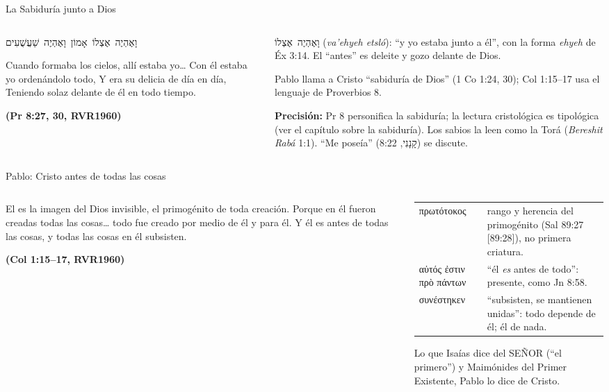 \documentclass[hyperref={bookmarks=false},aspectratio=169]{beamer}
\newcommand{\heb}[1]{\mbox{\foreignlanguage{hebrew}{#1}}}
\newcommand{\grc}[1]{\foreignlanguage{ancientgreek}{#1}}
\newcommand{\SENOR}{S{\fontsize{0.78em}{1em}\selectfont EÑOR}}
\newcommand{\fuente}[1]{\par\hfill{\upshape\bfseries\footnotesize\textcolor{azul}{#1}}}
\newcommand{\precision}[1]{{\footnotesize\color{gris}\textbf{Precisión:} #1}}
\begin{document}
\begin{frame}{La Sabiduría junto a Dios}
\begin{columns}[t,onlytextwidth]
\begin{column}{0.52\textwidth}
\begin{center}\heb{וָאֶהְיֶה אֶצְלוֹ אָמוֹן וָאֶהְיֶה שַׁעֲשֻׁעִים}\end{center}
\begin{cita}Cuando formaba los cielos, allí estaba yo\ldots{} Con él estaba yo ordenándolo todo, Y era su delicia de día en día, Teniendo solaz delante de él en todo tiempo.\fuente{(Pr 8:27, 30, RVR1960)}\end{cita}
\end{column}
\begin{column}{0.46\textwidth}\scriptsize
\heb{וָאֶהְיֶה אֶצְלוֹ} (\emph{va'ehyeh etsló}): ``y yo estaba junto a él'', con la forma \emph{ehyeh} de Éx 3:14. El ``antes'' es deleite y gozo delante de Dios.\par\smallskip
Pablo llama a Cristo ``sabiduría de Dios'' (1 Co 1:24, 30); Col 1:15--17 usa el lenguaje de Proverbios 8.\par\medskip
\precision{Pr 8 personifica la sabiduría; la lectura cristológica es tipológica (ver el capítulo sobre la sabiduría). Los sabios la leen como la Torá (\emph{Bereshit Rabá} 1:1). ``Me poseía'' (\heb{קָנָנִי}, 8:22) se discute.}
\end{column}
\end{columns}
\end{frame}

\begin{frame}{Pablo: Cristo antes de todas las cosas}
\begin{columns}[t,onlytextwidth]
\begin{column}{0.52\textwidth}
\begin{cita}El es la imagen del Dios invisible, el primogénito de toda creación. Porque en él fueron creadas todas las cosas\ldots{} todo fue creado por medio de él y para él. Y él es antes de todas las cosas, y todas las cosas en él subsisten.\fuente{(Col 1:15--17, RVR1960)}\end{cita}
\end{column}
\begin{column}{0.46\textwidth}\scriptsize\renewcommand{\arraystretch}{1.12}
\begin{tabular}{@{}>{\RaggedRight\arraybackslash}p{2.1cm}>{\RaggedRight\arraybackslash}p{3.4cm}@{}}
\toprule
\grc{πρωτότοκος} & rango y herencia del primogénito (Sal 89:27 [89:28]), no primera criatura. \\
\grc{αὐτός ἐστιν πρὸ πάντων} & ``él \emph{es} antes de todo'': presente, como Jn 8:58. \\
\grc{συνέστηκεν} & ``subsisten, se mantienen unidas'': todo depende de él; él de nada. \\
\bottomrule
\end{tabular}\par\smallskip
Lo que Isaías dice del \SENOR{} (``el primero'') y Maimónides del Primer Existente, Pablo lo dice de Cristo.
\end{column}
\end{columns}
\end{frame}
\end{document}
